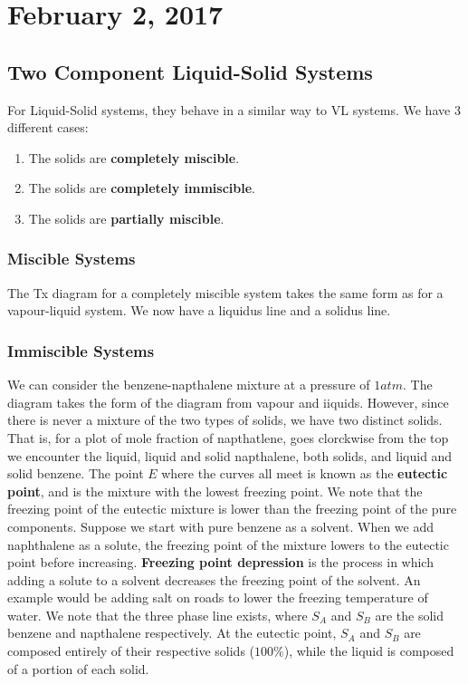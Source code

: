 \documentclass[11pt]{article}
\theoremstyle{plain} %
\theoremstyle{definition}
\theoremstyle{example}
\theoremstyle{remark}
\begin{document}
\section{February 2, 2017}
\subsection{Two Component Liquid-Solid Systems}

For Liquid-Solid systems, they behave in a similar way to VL systems. We have 3 different cases:
\begin{enumerate}
	\item The solids are \textbf{completely miscible}.
	\item The solids are \textbf{completely immiscible}.
	\item The solids are \textbf{partially miscible}.
\end{enumerate}

\subsubsection{Miscible Systems}
	
	The Tx diagram for a completely miscible system takes the same form as for a vapour-liquid system. We now have a liquidus line and a solidus line. 


\subsubsection{Immiscible Systems}
We can consider the benzene-napthalene mixture at a pressure of $1atm$. The diagram takes the form of the diagram from vapour and iiquids. However, since there is never a mixture of the two types of solids, we have two distinct solids. That is, for a plot of mole fraction of napthatlene, goes clorckwise from the top we encounter the liquid, liquid and solid napthalene, both solids, and liquid and solid benzene. The point $E$ where the curves all meet is known as the \textbf{eutectic point}, and is the mixture with the lowest freezing point. We note that the freezing point of the eutectic mixture is lower than the freezing point of the pure components. Suppose we start with pure benzene as a solvent. When we add naphthalene as a solute, the freezing point of the mixture lowers to the eutectic point before increasing. \textbf{Freezing point depression}  is the process in which adding a solute to a solvent decreases the freezing point of the solvent. An example would be adding salt on roads to lower the freezing temperature of water. We note that the three phase line exists, where $S_A$ and $S_B$ are the solid benzene and napthalene respectively. At the eutectic point, $S_A$ and $S_B$ are composed entirely of their respective solids ($100\%$), while the liquid is composed of a portion of each solid. 
\end{document}
